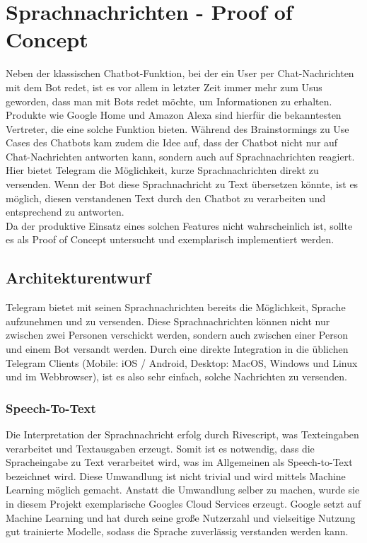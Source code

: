 \chapter{Sprachnachrichten - Proof of Concept}
Neben der klassischen Chatbot-Funktion, bei der ein User per Chat-Nachrichten mit dem Bot redet, ist es vor allem in letzter Zeit immer mehr zum Usus geworden, dass man mit Bots redet möchte, um Informationen zu erhalten. Produkte wie Google Home und Amazon Alexa sind hierfür die bekanntesten Vertreter, die eine solche Funktion bieten. Während des Brainstormings zu Use Cases des Chatbots kam zudem die Idee auf, dass der Chatbot nicht nur auf Chat-Nachrichten antworten kann, sondern auch auf Sprachnachrichten reagiert. \\Hier bietet Telegram die Möglichkeit, kurze Sprachnachrichten direkt zu versenden. Wenn der Bot diese Sprachnachricht zu Text übersetzen könnte, ist es möglich, diesen verstandenen Text durch den Chatbot zu verarbeiten und entsprechend zu antworten. \\
Da der produktive Einsatz eines solchen Features nicht wahrscheinlich ist, sollte es als Proof of Concept untersucht und exemplarisch implementiert werden.

\section{Architekturentwurf}
Telegram bietet mit seinen Sprachnachrichten bereits die Möglichkeit, Sprache aufzunehmen und zu versenden. Diese Sprachnachrichten können nicht nur zwischen zwei Personen verschickt werden, sondern auch zwischen einer Person und einem Bot versandt werden. Durch eine direkte Integration in die üblichen Telegram Clients (Mobile: iOS / Android, Desktop: MacOS, Windows und Linux und im Webbrowser), ist es also sehr einfach, solche Nachrichten zu versenden.

\subsection{Speech-To-Text}
Die Interpretation der Sprachnachricht erfolg durch Rivescript, was Texteingaben verarbeitet und Textausgaben erzeugt. Somit ist es notwendig, dass die Spracheingabe zu Text verarbeitet wird, was im Allgemeinen als Speech-to-Text bezeichnet wird. Diese Umwandlung ist nicht trivial und wird mittels Machine Learning möglich gemacht. Anstatt die Umwandlung selber zu machen, wurde sie in diesem Projekt exemplarische Googles Cloud Services erzeugt. Google setzt auf Machine Learning und hat durch seine große Nutzerzahl und vielseitige Nutzung gut trainierte Modelle, sodass die Sprache zuverlässig verstanden werden kann.

